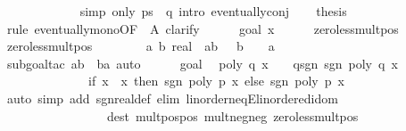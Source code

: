 \begin{isabellebody}
\ \ \ \ \ \ \ \ \ \ \ \isamarkupfalse%
\ {\isacharparenleft}simp\ only{\isacharcolon}\ {\isacharbackquoteopen}ps{\isacharbang}{}\ {\isacharequal}\ q{\isacharbackquoteclose}{\isacharcomma}\ intro\ eventually{\isacharunderscore}conj{\isacharparenright}\isanewline
\ \ \isamarkupfalse%
\ {\isacharquery}thesis\isanewline
\ \ \isamarkupfalse%
\ {\isacharparenleft}rule\ eventually{\isacharunderscore}mono{\isacharbrackleft}OF\ {\isacharunderscore}\ A{\isacharbrackright}{\isacharcomma}\ clarify{\isacharparenright}\isanewline
\ \ \ \ \isamarkupfalse%
\ {\isacharparenleft}goal{}\ x{\isacharparenright}\isanewline
\ \ \ \ \isamarkupfalse%
\ zero{\isacharunderscore}less{\isacharunderscore}mult{\isacharunderscore}pos\ \isamarkupfalse%
\ zero{\isacharunderscore}less{\isacharunderscore}mult{\isacharunderscore}pos{\isacharprime}{\isacharcolon}\isanewline
\ \ \ \ \ \ \ \ {\isachardoublequoteopen}{\isasymAnd}a\ b{\isachardot}\ {\isasymlbrakk}{\isacharparenleft}{}{\isacharcolon}{\isacharcolon}real{\isacharparenright}\ {\isacharless}\ a{\isacharasterisk}b{\isacharsemicolon}\ {}\ {\isacharless}\ b{\isasymrbrakk}\ {\isasymLongrightarrow}\ {}\ {\isacharless}\ a{\isachardoublequoteclose}\isanewline
\ \ \ \ \ \ \ \ \isamarkupfalse%
\ {\isacharparenleft}subgoal{\isacharunderscore}tac\ {\isachardoublequoteopen}a{\isacharasterisk}b\ {\isacharequal}\ b{\isacharasterisk}a{\isachardoublequoteclose}{\isacharcomma}\ auto{\isacharparenright}\isanewline
\ \ \ \ \isamarkupfalse%
\ goal{}\ \isamarkupfalse%
\ {\isachardoublequoteopen}poly\ q\ x\ {\isasymnoteq}\ {}{\isachardoublequoteclose}\ \ q{\isacharunderscore}sgn{\isacharcolon}\ {\isachardoublequoteopen}sgn\ {\isacharparenleft}poly\ q\ x{\isacharparenright}\ {\isacharequal}\ \isanewline
\ \ \ \ \ \ \ \ \ \ \ \ \ \ {\isacharparenleft}if\ x\ {\isacharless}\ x\ then\ {\isacharminus}sgn\ {\isacharparenleft}poly\ p\ x{\isacharparenright}\ else\ sgn\ {\isacharparenleft}poly\ p\ x{\isacharparenright}{\isacharparenright}{\isachardoublequoteclose}\isanewline
\ \ \ \ \ \ \ \ \isamarkupfalse%
\ {\isacharparenleft}auto\ simp\ add{\isacharcolon}\ sgn{\isacharunderscore}real{\isacharunderscore}def\ elim{\isacharcolon}\ linorder{\isacharunderscore}neqE{\isacharunderscore}linordered{\isacharunderscore}idom\isanewline
\ \ \ \ \ \ \ \ \ \ \ \ \ \ \ \ \ dest{\isacharcolon}\ mult{\isacharunderscore}pos{\isacharunderscore}pos\ mult{\isacharunderscore}neg{\isacharunderscore}neg\ zero{\isacharunderscore}less{\isacharunderscore}mult{\isacharunderscore}pos\ \isanewline

\end{isabellebody}
